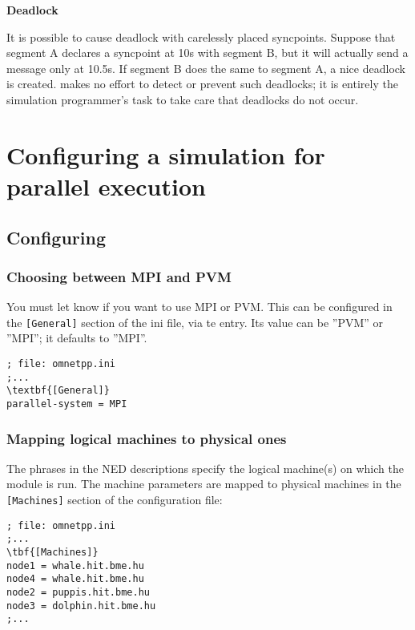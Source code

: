 \textbf{Deadlock}


It is possible to cause deadlock
with carelessly placed syncpoints.  Suppose that segment A declares a
syncpoint at 10s with segment B, but it will actually send a message
only at 10.5s. If segment B does the same to segment A, a nice
deadlock is created. {\opp} makes no effort to detect or prevent such
deadlocks; it is entirely the simulation programmer's task to take
care that deadlocks do not occur.




\section{Configuring a simulation for parallel execution}

\subsection{Configuring {\opp}}

\subsubsection{Choosing between MPI and PVM}


You must let {\opp} know if you want to use MPI or
PVM. This can be configured in the \texttt{[General]}
section of the ini file, via te
 entry. Its value can be
''PVM'' or ''MPI''; it defaults to ''MPI''.

\begin{Verbatim}[commandchars=\\\{\}]
; file: omnetpp.ini
;...
\textbf{[General]}
parallel-system = MPI
\end{Verbatim}


\subsubsection{Mapping logical machines to physical ones}
\label{sec:ch-parallel-exec:machine-mapping}

The  phrases in the NED descriptions
specify the logical machine(s) on which the module is run. The machine
parameters are mapped to physical machines in the \texttt{[Machines]}
section of the configuration file:

\begin{Verbatim}[commandchars=\\\{\}]
; file: omnetpp.ini
;...
\tbf{[Machines]}
node1 = whale.hit.bme.hu
node4 = whale.hit.bme.hu
node2 = puppis.hit.bme.hu
node3 = dolphin.hit.bme.hu
;...
\end{Verbatim}


